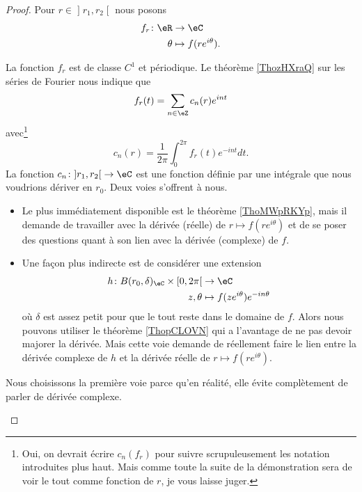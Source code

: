 \begin{proof}
	Pour \( r\in\mathopen] r_1 , r_2 \mathclose[\) nous posons
	\begin{equation}
		\begin{aligned}
			f_r\colon \eR & \to \eC                   \\
			\theta        & \mapsto f(r e^{i\theta}).
		\end{aligned}
	\end{equation}
	\begin{subproof}
		La fonction \( f_r\) est de classe \( C^1\) et périodique. Le théorème \ref{ThozHXraQ} sur les séries de Fourier nous indique que
		\begin{equation}      \label{EQooIHQRooZWqJKL}
			f_r(t)=\sum_{n\in \eZ}c_n(r) e^{int}
		\end{equation}
		avec\footnote{Oui, on devrait écrire \( c_n(f_r)\) pour suivre scrupuleusement les notation introduites plus haut. Mais comme toute la suite de la démonstration sera de voir le tout comme fonction de \( r\), je vous laisse juger.}
		\begin{equation}
			c_n(r)=\frac{1}{ 2\pi }\int_0^{2\pi}f_r(t) e^{-int}dt.
		\end{equation}
		La fonction \( c_n\colon \mathopen] r_1 , r_2 \mathclose[\to \eC\) est une fonction définie par une intégrale que nous voudrions dériver en \( r_0\).
			\spitem[Digression]
			Deux voies s'offrent à nous.
			\begin{itemize}
				\item Le plus immédiatement disponible est le théorème \ref{ThoMWpRKYp}, mais il demande de travailler avec la dérivée (réelle) de \( r\mapsto f(r e^{i\theta})\) et de se poser des questions quant à son lien avec la dérivée (complexe) de \( f\).
				\item Une façon plus indirecte est de considérer une extension
				      \begin{equation}
					      \begin{aligned}
						      h\colon B(r_0,\delta)_{\eC}\times \mathopen[ 0 , 2\pi \mathclose[ & \to \eC                                \\
						      z,\theta                                                          & \mapsto f(z e^{i\theta}) e^{-in\theta}
					      \end{aligned}
				      \end{equation}
				      où \( \delta\) est assez petit pour que le tout reste dans le domaine de \( f\). Alors nous pouvons utiliser le théorème \ref{ThopCLOVN} qui a l'avantage de ne pas devoir majorer la dérivée. Mais cette voie demande de réellement faire le lien entre la dérivée complexe de \( h\) et la dérivée réelle de \( r\mapsto f(r e^{i\theta})\).
			\end{itemize}
			Nous choisissons la première voie parce qu'en réalité, elle évite complètement de parler de dérivée complexe.


\end{subproof}
\end{proof}
